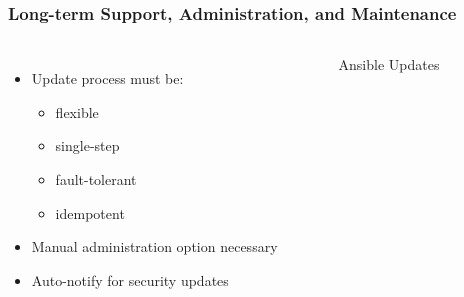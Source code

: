 \begin{frame}
\frametitle{Long-term Support, Administration, and Maintenance}

\begin{columns}[c]

\vspace{-15mm}
\begin{itemize}
    \item Update process must be:
        \begin{itemize}
            \item flexible
            \item single-step
            \item fault-tolerant
            \item idempotent
        \end{itemize}
    \item Manual administration option necessary
    \item Auto-notify for security updates
\end{itemize}


\begin{figure}
\caption*{Ansible Updates}
\end{figure}

\end{columns}

\end{frame}
